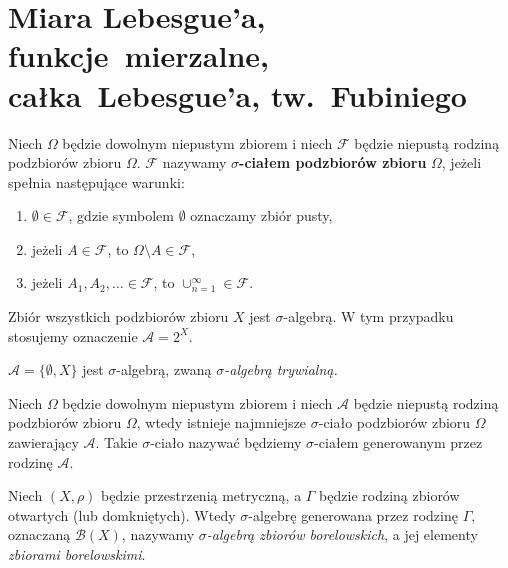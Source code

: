 \chapter{Miara Lebesgue’a, funkcje~mierzalne, całka~Lebesgue’a, tw.~Fubiniego}
	\begin{df}
		Niech $\Omega$ będzie dowolnym niepustym zbiorem i niech $\mathcal{F}$ będzie niepustą rodziną podzbiorów zbioru $\Omega$. $\mathcal{F}$ nazywamy\textbf{ $\sigma$-ciałem podzbiorów zbioru }$\Omega$, jeżeli spełnia następujące warunki:
		\begin{enumerate}
			\item $\emptyset \in \mathcal{F}$, gdzie symbolem $\emptyset$ oznaczamy zbiór pusty,
			\item jeżeli $A \in \mathcal{F}$, to $\Omega \setminus A \in \mathcal{F}$,
			\item jeżeli $A_1, A_2, \ldots \in \mathcal{F}$, to $\cup_{n=1}^{\infty} \in \mathcal{F}$.
		\end{enumerate}
	\end{df}	
	
	\begin{przyk}
		Zbiór wszystkich podzbiorów zbioru $X$ jest $\sigma$-algebrą. W tym przypadku stosujemy oznaczenie $\mathcal{A} = 2^X$.
	\end{przyk}
	
	\begin{przyk}
		$\mathcal{A} = \{\emptyset, X\}$ jest $\sigma$-algebrą, zwaną \textit{$\sigma$-algebrą trywialną.}
	\end{przyk}
	
	\begin{tw}
		Niech $\Omega$ będzie dowolnym niepustym zbiorem i niech $\mathcal{A}$ będzie niepustą rodziną podzbiorów zbioru $\Omega$, wtedy istnieje najmniejsze $\sigma$-ciało podzbiorów zbioru $\Omega$ zawierający $\mathcal{A}$. Takie $\sigma$-ciało nazywać będziemy $\sigma$-ciałem generowanym przez rodzinę $\mathcal{A}$.
	\end{tw}
	
	\begin{df}
		Niech $(X, \rho)$ będzie przestrzenią metryczną, a $\Gamma$ będzie rodziną zbiorów otwartych (lub domkniętych). Wtedy $\sigma$-algebrę generowana przez rodzinę $\Gamma$, oznaczaną  $\mathcal{B}(X)$,  nazywamy \textit{$\sigma$-algebrą zbiorów borelowskich}, a jej elementy \textit{zbiorami borelowskimi}.
	\end{df}
	
